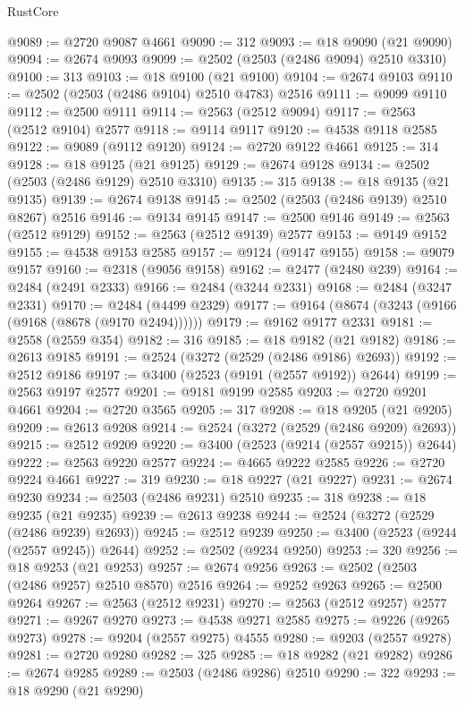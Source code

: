 \begin{lexlean}{RustCore}
\begin{coremodule}
@9089 := @2720 @9087 @4661
@9090 := 312
@9093 := @18 @9090 (@21 @9090)
@9094 := @2674 @9093
@9099 := @2502 (@2503 (@2486 @9094) @2510 @3310)
@9100 := 313
@9103 := @18 @9100 (@21 @9100)
@9104 := @2674 @9103
@9110 := @2502 (@2503 (@2486 @9104) @2510 @4783) @2516
@9111 := @9099 @9110
@9112 := @2500 @9111
@9114 := @2563 (@2512 @9094)
@9117 := @2563 (@2512 @9104) @2577
@9118 := @9114 @9117
@9120 := @4538 @9118 @2585
@9122 := @9089 (@9112 @9120)
@9124 := @2720 @9122 @4661
@9125 := 314
@9128 := @18 @9125 (@21 @9125)
@9129 := @2674 @9128
@9134 := @2502 (@2503 (@2486 @9129) @2510 @3310)
@9135 := 315
@9138 := @18 @9135 (@21 @9135)
@9139 := @2674 @9138
@9145 := @2502 (@2503 (@2486 @9139) @2510 @8267) @2516
@9146 := @9134 @9145
@9147 := @2500 @9146
@9149 := @2563 (@2512 @9129)
@9152 := @2563 (@2512 @9139) @2577
@9153 := @9149 @9152
@9155 := @4538 @9153 @2585
@9157 := @9124 (@9147 @9155)
@9158 := @9079 @9157
@9160 := @2318 (@9056 @9158)
@9162 := @2477 (@2480 @239)
@9164 := @2484 (@2491 @2333)
@9166 := @2484 (@3244 @2331)
@9168 := @2484 (@3247 @2331)
@9170 := @2484 (@4499 @2329)
@9177 := @9164 (@8674 (@3243 (@9166 (@9168 (@8678 (@9170 @2494))))))
@9179 := @9162 @9177 @2331
@9181 := @2558 (@2559 @354)
@9182 := 316
@9185 := @18 @9182 (@21 @9182)
@9186 := @2613 @9185
@9191 := @2524 (@3272 (@2529 (@2486 @9186) @2693))
@9192 := @2512 @9186
@9197 := @3400 (@2523 (@9191 (@2557 @9192)) @2644)
@9199 := @2563 @9197 @2577
@9201 := @9181 @9199 @2585
@9203 := @2720 @9201 @4661
@9204 := @2720 @3565
@9205 := 317
@9208 := @18 @9205 (@21 @9205)
@9209 := @2613 @9208
@9214 := @2524 (@3272 (@2529 (@2486 @9209) @2693))
@9215 := @2512 @9209
@9220 := @3400 (@2523 (@9214 (@2557 @9215)) @2644)
@9222 := @2563 @9220 @2577
@9224 := @4665 @9222 @2585
@9226 := @2720 @9224 @4661
@9227 := 319
@9230 := @18 @9227 (@21 @9227)
@9231 := @2674 @9230
@9234 := @2503 (@2486 @9231) @2510
@9235 := 318
@9238 := @18 @9235 (@21 @9235)
@9239 := @2613 @9238
@9244 := @2524 (@3272 (@2529 (@2486 @9239) @2693))
@9245 := @2512 @9239
@9250 := @3400 (@2523 (@9244 (@2557 @9245)) @2644)
@9252 := @2502 (@9234 @9250)
@9253 := 320
@9256 := @18 @9253 (@21 @9253)
@9257 := @2674 @9256
@9263 := @2502 (@2503 (@2486 @9257) @2510 @8570) @2516
@9264 := @9252 @9263
@9265 := @2500 @9264
@9267 := @2563 (@2512 @9231)
@9270 := @2563 (@2512 @9257) @2577
@9271 := @9267 @9270
@9273 := @4538 @9271 @2585
@9275 := @9226 (@9265 @9273)
@9278 := @9204 (@2557 @9275) @4555
@9280 := @9203 (@2557 @9278)
@9281 := @2720 @9280
@9282 := 325
@9285 := @18 @9282 (@21 @9282)
@9286 := @2674 @9285
@9289 := @2503 (@2486 @9286) @2510
@9290 := 322
@9293 := @18 @9290 (@21 @9290)

\end{coremodule}
\end{lexlean}
